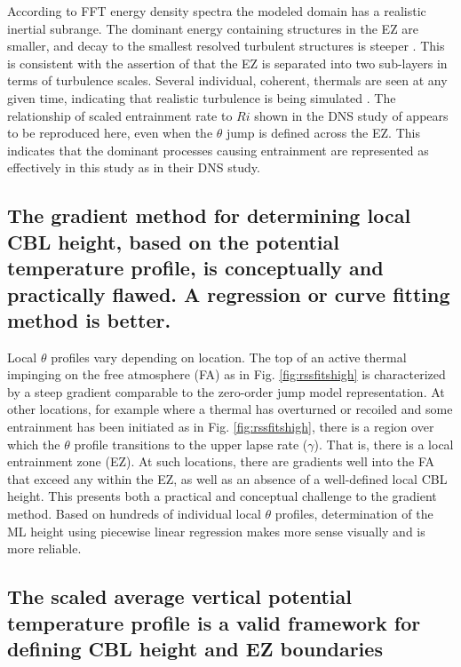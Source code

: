 According to FFT energy density spectra the modeled domain has a realistic inertial subrange.  The dominant energy containing structures in the EZ are smaller, and decay to the smallest resolved turbulent structures is steeper \citep{NChap14}. This is consistent with the assertion of \cite{GarciaMellado} that the EZ is separated into two sub-layers in terms of turbulence scales.  Several individual, coherent, thermals are seen at any given time, indicating that realistic turbulence is being simulated \citep{NChap14}.  The relationship of scaled entrainment rate to $Ri$ shown in the DNS study of \cite{GarciaMellado} appears to be reproduced here, even when the $\theta$ jump is defined across the EZ.  This indicates that the dominant processes causing entrainment are represented as effectively in this study as in their DNS study.

\subsection{The gradient method for determining local CBL height, based on the potential temperature profile, is conceptually and practically flawed.  A regression or curve fitting method is better.}

Local $\theta$ profiles vary depending on location.  The top of an active thermal impinging on the free atmosphere (FA) as in Fig. \ref{fig:rssfitshigh} is characterized by a steep gradient comparable to the zero-order jump model representation.  At other locations, for example where a thermal has overturned or recoiled and some entrainment has been initiated as in Fig. \ref{fig:rssfitshigh}, there is a region over which the $\theta$ profile transitions to the upper lapse rate ($\gamma$). That is, there is a local entrainment zone (EZ).  At such locations, there are gradients well into the FA that exceed any within the EZ, as well as an absence of a well-defined local CBL height.  This presents both a practical and conceptual challenge to the gradient method.  Based on hundreds of individual local $\theta$ profiles, determination of the ML height using piecewise linear regression makes more sense visually and is more reliable. 

\subsection{The scaled average vertical potential temperature profile is a valid framework for defining CBL height and EZ boundaries}

